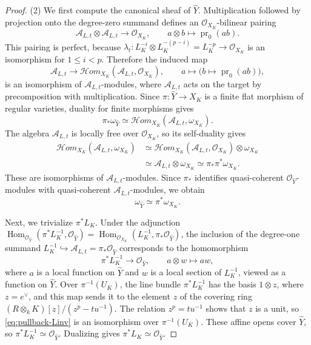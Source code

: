 \documentclass[10pt,abstract=true]{scrartcl}
\numberwithin{equation}{section}
\theoremstyle{definition}
\theoremstyle{remark}
\begin{document}
\begin{proof}
  \smallskip
  (2) We first compute the canonical sheaf of $\widehat Y$.
  Multiplication followed by projection onto the degree-zero summand defines an $\mathcal O_{X_K}$-bilinear pairing
  \[
    \mathcal A_{L,t}\otimes\mathcal A_{L,t}
      \longrightarrow\mathcal O_{X_K},
    \qquad a\otimes b\longmapsto\operatorname{pr}_0(ab).
  \]
  This pairing is perfect, because $\lambda_t\colon L_K^{-i}\otimes L_K^{-(p-i)}=L_K^{-p}\to\mathcal O_{X_K}$ is an isomorphism for $1\le i<p$.
  Therefore the induced map \[
    \mathcal A_{L,t}\longrightarrow
      \mathcal H\!om_{X_K}(\mathcal A_{L,t},\mathcal O_{X_K}),
    \qquad
    a\longmapsto\bigl(b\mapsto\operatorname{pr}_0(ab)\bigr),
  \]
  is an isomorphism of $\mathcal A_{L,t}$-modules, where $\mathcal A_{L,t}$ acts on the target by precomposition with multiplication.
  Since $\pi\colon\widehat Y\to X_K$ is a finite flat morphism of regular varieties, duality for finite morphisms gives
  \[
    \pi_*\omega_{\widehat Y}
      \simeq
    \mathcal H\!om_{X_K}(\mathcal A_{L,t},\omega_{X_K}).
  \]
  The algebra $\mathcal A_{L,t}$ is locally free over $\mathcal O_{X_K}$, so its self-duality gives
  \begin{align*}
    \mathcal H\!om_{X_K}(\mathcal A_{L,t},\omega_{X_K})
      &\simeq
        \mathcal H\!om_{X_K}(\mathcal A_{L,t},\mathcal O_{X_K})
          \otimes\omega_{X_K}\\
      &\simeq \mathcal A_{L,t}\otimes\omega_{X_K}
       \simeq \pi_*\pi^*\omega_{X_K}.
  \end{align*}
  These are isomorphisms of $\mathcal A_{L,t}$-modules.
  Since $\pi_*$ identifies quasi-coherent $\mathcal O_{\widehat Y}$-modules with quasi-coherent $\mathcal A_{L,t}$-modules, we obtain
  \[
    \omega_{\widehat Y}\simeq\pi^*\omega_{X_K}.
  \]

  Next, we trivialize $\pi^*L_K$.
  Under the adjunction $\operatorname{Hom}_{\mathcal O_{\widehat Y}}(\pi^*L_K^{-1},\mathcal O_{\widehat Y})=\operatorname{Hom}_{\mathcal O_{X_K}}(L_K^{-1},\pi_*\mathcal O_{\widehat Y})$, the inclusion of the degree-one summand $L_K^{-1}\hookrightarrow\mathcal A_{L,t}=\pi_*\mathcal O_{\widehat Y}$ corresponds to the homomorphism
  \begin{equation}\label{eq:pullback-Linv}
    \pi^*L_K^{-1}\longrightarrow \mathcal O_{\widehat Y},\qquad a\otimes w\longmapsto aw,
  \end{equation}
  where $a$ is a local function on $\widehat Y$ and $w$ is a local section of $L_K^{-1}$, viewed as a function on $\widehat Y$.
  Over $\pi^{-1}(U_K)$, the line bundle $\pi^*L_K^{-1}$ has the basis $1\otimes z$, where $z=e^\vee$, and this map sends it to the element $z$ of the covering ring $(R\otimes_kK)[z]/(z^p-tu^{-1})$.
  The relation $z^p=tu^{-1}$ shows that $z$ is a unit, so \eqref{eq:pullback-Linv} is an isomorphism over $\pi^{-1}(U_K)$.
  These affine opens cover $\widehat Y$, so $\pi^*L_K^{-1}\simeq\mathcal O_{\widehat Y}$.
  Dualizing gives $\pi^*L_K\simeq\mathcal O_{\widehat Y}$.


\end{proof}
\end{document}
